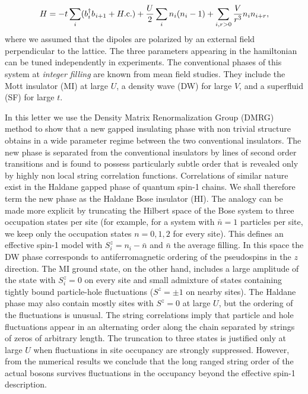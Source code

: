 \documentclass[prb,twocolumn,,amsmath,amssymb,floatfix]{revtex4}
\newcommand{\be}{\begin{equation}}
\newcommand{\ee}{\end{equation}}
\def \be{\begin{equation}}
\def \ee{\end{equation}}
\def \nd{{^{\vphantom{\dagger}}}}
\def \yd{^\dagger}
\begin{document}
\be H=-t\sum_{i}(b\yd_i b\nd_{i+1}+H.{\rm c}.)+{U\over 2}\sum_i
n_i(n_i-1)+\sum_{i,r>0}{V\over r^3}n_i n_{i+r}, \label{H} \ee where
we assumed that the dipoles are polarized by an external field
perpendicular to the lattice. The three parameters appearing in the
hamiltonian can be tuned independently in experiments\cite{goral}.
The conventional phases of this system at {\em integer filling} are
known from mean field studies\cite{goral,pai}. They include the
Mott insulator (MI) at large $U$, a density wave (DW) for large $V$,
and a superfluid (SF) for large $t$.

In this letter we use the Density Matrix Renormalization Group
(DMRG) method \cite{white} to show that a new gapped insulating
phase with non trivial structure obtains in a wide parameter regime
between the two conventional insulators. The new phase is separated
from the conventional insulators by lines of second order
transitions and is found to possess particularly subtle order that
is revealed only by highly non local string correlation functions.
Correlations of similar nature exist in the Haldane
gapped\cite{haldane} phase of quantum spin-1
chains\cite{rommelse,KennedyTasaki}. We shall therefore term the new
phase as the Haldane Bose insulator (HI). The analogy can be made
more explicit by truncating the Hilbert space of the Bose system to
three occupation states per site (for example, for a system with
${\bar n}=1$ particles per site, we keep only the occupation states
$n=0,1,2$ for every site). This defines an effective spin-1 model
with $S^z_i=n_i-{\bar n}$ and $\bar n$ the average filling. In this
space the DW phase corresponds to antiferromagnetic ordering of the
pseudospins in the $z$ direction. The MI ground state, on the other
hand, includes a large amplitude of the state with $S^z_i=0$ on
every site and small admixture of states containing tightly bound
particle-hole fluctuations ($S^z=\pm 1$ on nearby sites). The
Haldane phase may also contain mostly sites with $S^z=0$ at large
$U$, but the ordering of the fluctuations is unusual. The string
correlations imply that particle and hole fluctuations appear in an
alternating order along the chain separated by strings of zeros of
arbitrary length\cite{rommelse,KennedyTasaki}. The truncation to
three states is justified only at large $U$ when fluctuations in
site occupancy are strongly suppressed. However, from the numerical
results we conclude that the long ranged string order of the actual
bosons survives fluctuations in the occupancy beyond the effective
spin-1 description.
\end{document}
